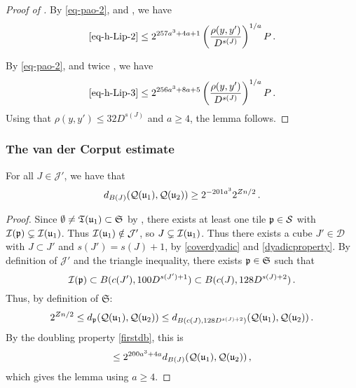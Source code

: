 \begin{proof}[Proof of ]
        By \eqref{eq-pao-2},  and , we have
        $$
            \eqref{eq-h-Lip-2} \le 2^{257a^3+4a+1} \left(\frac{\rho(y,y')}{D^{s(J)}}\right)^{1/a} P\,.
        $$

        By \eqref{eq-pao-2}, and twice , we have
        $$
            \eqref{eq-h-Lip-3} \le 2^{256a^3+8a+5} \left(\frac{\rho(y,y')}{D^{s(J)}}\right)^{1/a} P\,.
        $$
        Using that $\rho(y,y') \le 32D^{s(J)}$ and $a \ge 4$, the lemma follows.
    \end{proof}

\subsubsection{The van der Corput estimate}
\label{subsubsec-van-der-corput}
    \begin{lemma}
        \label{lower-oscillation-bound}
        \leanok
        For all $J \in \mathcal{J}'$, we have that
        $$
            d_{B(J)}({\mathcal{Q}}({\mathfrak u}_1), {\mathcal{Q}}({\mathfrak u}_2)) \ge 2^{-201a^3} 2^{Zn/2}\,.
        $$
    \end{lemma}

    \begin{proof}
    \leanok
    Since $\emptyset \ne {\mathfrak T}({\mathfrak u}_1) \subset \mathfrak{S}$ by , there exists at least one tile ${\mathfrak p} \in \mathcal{S}$ with ${\mathcal{I}}({\mathfrak p}) \subsetneq {\mathcal{I}}({\mathfrak u}_1)$. Thus ${\mathcal{I}}({\mathfrak u}_1) \notin \mathcal{J}'$, so $J \subsetneq {\mathcal{I}}({\mathfrak u}_1)$. Thus there exists a cube $J' \in \mathcal{D}$ with $J \subset J'$ and $s(J') = s(J) + 1$, by \eqref{coverdyadic} and \eqref{dyadicproperty}. By definition of $\mathcal{J'}$ and the triangle inequality, there exists ${\mathfrak p} \in \mathfrak{S}$ such that
    $$
        {\mathcal{I}}({\mathfrak p}) \subset B(c(J'), 100 D^{s(J') + 1}) \subset B(c(J), 128 D^{s(J)+2})\,.
    $$
    Thus, by definition of $\mathfrak{S}$:
    \begin{align*}
        2^{Zn/2} \le d_{{\mathfrak p}}({\mathcal{Q}}({\mathfrak u}_1), {\mathcal{Q}}({\mathfrak u}_2)) \le d_{B(c(J), 128 D^{s(J)+2})}({\mathcal{Q}}({\mathfrak u}_1), {\mathcal{Q}}({\mathfrak u}_2))\,.
    \end{align*}
    By the doubling property \eqref{firstdb}, this is
    $$
        \le 2^{200a^3 + 4a} d_{B(J)}({\mathcal{Q}}({\mathfrak u}_1), {\mathcal{Q}}({\mathfrak u}_2))\,,
    $$
    which gives the lemma using $a \ge 4$.
    \end{proof}


